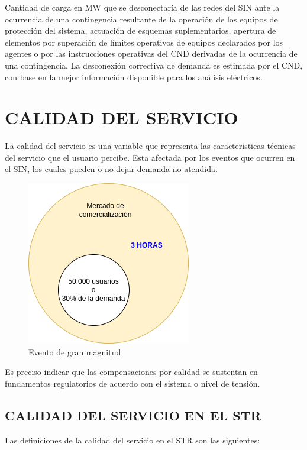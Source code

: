 \documentclass[a5paper]{book}%
\begin{document}
Cantidad de carga en MW que se desconectaría de las redes del SIN ante la ocurrencia de una contingencia resultante de la operación de los equipos de protección del sistema, actuación de esquemas suplementarios, apertura de elementos por superación de límites operativos de equipos declarados por los agentes o por las instrucciones operativas del CND derivadas de la ocurrencia de una contingencia. La desconexión correctiva de demanda es estimada por el CND, con base en la mejor información disponible para los análisis eléctricos.

\chapter{CALIDAD DEL SERVICIO}

La calidad del servicio  es una variable que representa las características técnicas del servicio que el usuario percibe. Esta afectada por los eventos que ocurren en
el \ac{SIN}, los cuales pueden o no dejar demanda no atendida.

\begin{figure}[H]
  \centering
  \caption{Evento de gran magnitud}
  \label{fig:eventogranmagnitud}
  \includegraphics[width=0.6\linewidth]{evento_gran_magnitud}
\end{figure}

Es preciso indicar que las compensaciones por calidad se sustentan en fundamentos regulatorios
de acuerdo con el sistema o nivel de tensión.


\section{CALIDAD DEL SERVICIO EN EL STR}

Las definiciones de la calidad del servicio en el \ac{STR} son las siguientes:
\end{document}
